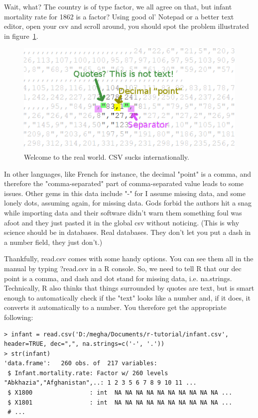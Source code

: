 \documentclass{report}
\newcommand{\code}[1]{\textsf{\ttfamily #1}}
\begin{document}
	Wait, what? The country is of type factor, we all agree on that, but infant mortality rate for 1862 is a factor? Using good ol' Notepad or a better text editor, open your csv and scroll around, you should spot the problem illustrated in figure~\ref{fig:welcome}.
	\begin{figure}[h]
		\centering
		\includegraphics[width=1.0\textwidth]{welcometotherealworld.png}
		\caption{Welcome to the real world. CSV sucks internationally.}
	\label{fig:welcome}
	\end{figure}

	In other languages, like French for instance, the decimal "point" is a comma, and therefore the "comma-separated" part of comma-separated value leads to some issues. Other gems in this data include "-" for I assume missing data, and some lonely dots, assuming again, for missing data. Gods forbid the authors hit a snag while importing data and their software didn't warn them something foul was afoot and they just pasted it in the global csv without noticing. (This is why science should be in databases. Real databases. They don't let you put a dash in a number field, they just don't.)

	Thankfully, \code{read.csv} comes with some handy options. You can see them all in the manual by typing \code{?read.csv} in a R console. So, we need to tell R that our \code{dec} point is a comma, and dash and dot stand for missing data, i.e. \code{na.strings}. Technically, R also thinks that things surrounded by quotes are text, but is smart enough to automatically check if the "text" looks like a number and, if it does, it converts it automatically to a number. You therefore get the appropriate following:
	\begin{verbatim}
> infant = read.csv('D:/megha/Documents/r-tutorial/infant.csv', header=TRUE, dec=",", na.strings=c('-', '.'))
> str(infant)
'data.frame':   260 obs. of  217 variables:
 $ Infant.mortality.rate: Factor w/ 260 levels "Abkhazia","Afghanistan",..: 1 2 3 5 6 7 8 9 10 11 ...
 $ X1800                : int  NA NA NA NA NA NA NA NA NA NA ...
 $ X1801                : int  NA NA NA NA NA NA NA NA NA NA ...
 # ...
	 \end{verbatim}
\end{document}

